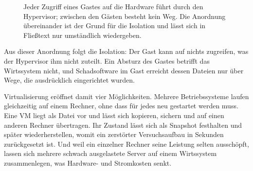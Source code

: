 \begin{figure}[H]
\centering
{}
\caption[Schichten der Virtualisierung mit VirtualBox]{Jeder Zugriff eines Gastes auf die Hardware führt durch den Hypervisor; zwischen den Gästen besteht kein Weg. Die Anordnung übereinander ist der Grund für die Isolation und lässt sich in Fließtext nur umständlich wiedergeben.}
\label{abb:schichten}
\end{figure}

Aus dieser Anordnung folgt die Isolation: Der Gast kann auf nichts zugreifen, was der Hypervisor ihm nicht zuteilt. Ein Absturz des Gastes betrifft das Wirtssystem nicht, und Schadsoftware im Gast erreicht dessen Dateien nur über Wege, die ausdrücklich eingerichtet wurden.

Virtualisierung eröffnet damit vier Möglichkeiten. Mehrere Betriebssysteme laufen gleichzeitig auf einem Rechner, ohne dass für jedes neu gestartet werden muss. Eine VM liegt als Datei vor und lässt sich kopieren, sichern und auf einen anderen Rechner übertragen. Ihr Zustand lässt sich als Snapshot festhalten und später wiederherstellen, womit ein zerstörter Versuchsaufbau in Sekunden zurückgesetzt ist. Und weil ein einzelner Rechner seine Leistung selten ausschöpft, lassen sich mehrere schwach ausgelastete Server auf einem Wirtssystem zusammenlegen, was Hardware- und Stromkosten senkt.

